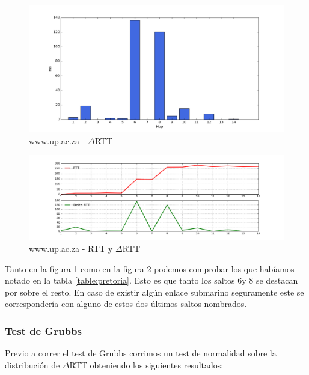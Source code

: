 \begin{figure}[H]
    \begin{center}
        \includegraphics[width=1\textwidth]{data/rtt-pretoria-bar.png}
        \caption{www.up.ac.za - $\Delta$RTT}
        \label{histo:pretoria}
    \end{center}
\end{figure}

\begin{figure}[H]
    \begin{center}
        \includegraphics[width=1\textwidth]{data/rtt-pretoria-lines.png}
        \caption{www.up.ac.za - RTT y $\Delta$RTT}
        \label{lines:pretoria}
    \end{center}
\end{figure}

Tanto en la figura \ref{histo:pretoria} como en la figura \ref{lines:pretoria} podemos comprobar los que habíamos notado en la tabla \ref{table:pretoria}. Esto es que tanto los saltos 6y 8 se destacan por sobre el resto. En caso de existir algún enlace submarino seguramente este se correspondería con alguno de estos dos últimos saltos nombrados.

\subsubsection{Test de Grubbs}\label{pretoria:grubbs}
Previo a correr el test de Grubbs corrimos un test de normalidad sobre la distribución de $\Delta$RTT obteniendo los siguientes resultados:

